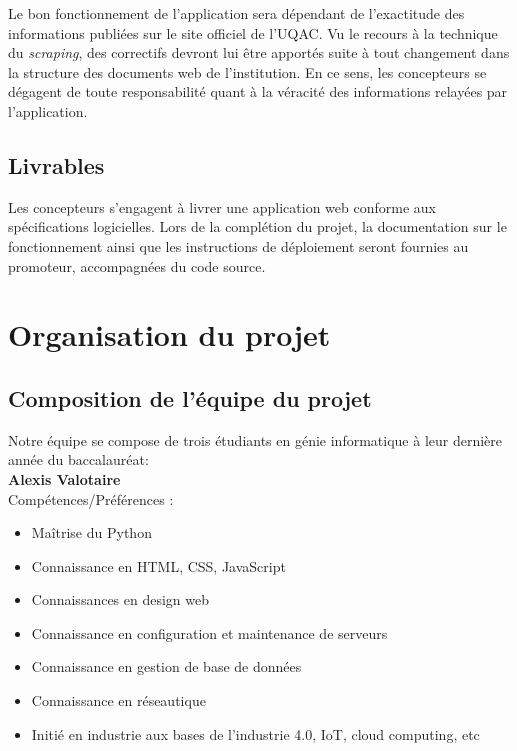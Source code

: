 \documentclass[12pt]{article}
\begin{document}
Le bon fonctionnement de l'application sera dépendant de l'exactitude des informations publiées sur le site officiel de 
l'UQAC.  Vu le recours à la technique du \textit{scraping}, des correctifs devront lui être apportés suite à tout changement dans la structure des documents web de l'institution.  En ce sens, les concepteurs se dégagent de toute responsabilité quant à la véracité des informations relayées par l'application.

\subsection{Livrables}
Les concepteurs s'engagent à livrer une application web conforme aux spécifications logicielles.  Lors de la complétion du projet, la documentation sur le fonctionnement ainsi que les instructions de déploiement seront fournies au promoteur, accompagnées du code source. 

\newpage

\section{Organisation du projet}

\subsection{Composition de l'équipe du projet}

Notre équipe se compose de trois étudiants en génie informatique à leur dernière
année du baccalauréat: \\
    

\noindent \textbf{Alexis Valotaire} \\
Compétences/Préférences :
\begin{itemize}
    \item Maîtrise du Python
    \item Connaissance en HTML, CSS, JavaScript
    \item Connaissances en design web
    \item Connaissance en configuration et maintenance de serveurs
    \item Connaissance en gestion de base de données
    \item Connaissance en réseautique
    \item Initié en industrie aux bases de l’industrie 4.0, IoT, cloud
    computing, etc \\
\end{itemize}
\end{document}
